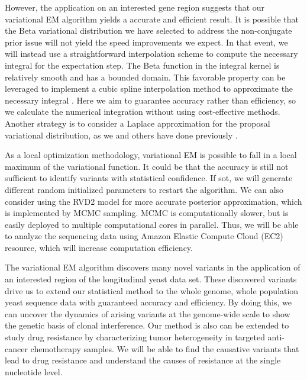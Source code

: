 \documentclass[11pt,reqno]{amsart}
\begin{document}
However, the application on an interested gene region suggests that our variational EM algorithm yields a accurate and efficient result.
It is possible that the Beta variational distribution we have selected to address the non-conjugate prior issue will not yield the speed improvements we expect.
In that event, we will instead use a straightforward interpolation scheme to compute the necessary integral for the expectation step.
The Beta function in the integral kernel is relatively smooth and has a bounded domain.
This favorable property can be leveraged to implement a cubic spline interpolation method to approximate the necessary integral \citep{mckinley1998cubic}.
Here we aim to guarantee accuracy rather than efficiency, so we calculate the numerical integration without using cost-effective methods.
Another strategy is to consider a Laplace approximation for the proposal variational distribution, as we and others have done previously \citep{saddiki2014glad, wang2013variational}.

As a local optimization methodology, variational EM is possible to fall in a local maximum of the variational function.
It could be that the accuracy is still not sufficient to identify variants with statistical confidence.
If sot, we will generate different random initialized parameters to restart the algorithm.
We can also consider using the RVD2 model for more accurate posterior approximation, which is implemented by MCMC sampling.
MCMC is computationally slower, but is easily deployed to multiple computational cores in parallel.
Thus, we will be able to analyze the sequencing data using Amazon Elastic Compute Cloud (EC2) resource, which will increase computation efficiency.

The variational EM algorithm discovers many novel variants in the application of an interested region of the longitudinal yeast data set.
These discovered variants drive us to extend our statistical method to the whole genome, whole population yeast sequence data with guaranteed accuracy and efficiency.
By doing this, we can uncover the dynamics of arising variants at the genome-wide scale to show the genetic basis of clonal interference.
Our method is also can be extended to study drug resistance by characterizing tumor heterogeneity in targeted anti-cancer chemotherapy samples.
We will be able to find the causative variants that lead to drug resistance and understand the causes of resistance at the single nucleotide level.
\end{document}
